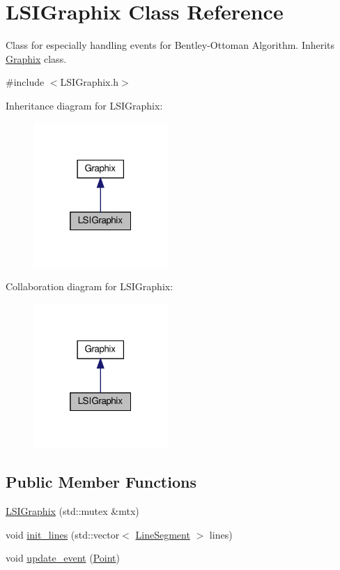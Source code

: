 \hypertarget{classLSIGraphix}{}\section{L\+S\+I\+Graphix Class Reference}
\label{classLSIGraphix}


Class for especially handling events for Bentley-\/\+Ottoman Algorithm. Inherits \hyperlink{classGraphix}{Graphix} class.  




{\ttfamily \#include $<$L\+S\+I\+Graphix.\+h$>$}



Inheritance diagram for L\+S\+I\+Graphix\+:
\nopagebreak
\begin{figure}[H]
\begin{center}
\leavevmode
\includegraphics[width=145pt]{classLSIGraphix__inherit__graph}
\end{center}
\end{figure}


Collaboration diagram for L\+S\+I\+Graphix\+:
\nopagebreak
\begin{figure}[H]
\begin{center}
\leavevmode
\includegraphics[width=145pt]{classLSIGraphix__coll__graph}
\end{center}
\end{figure}
\subsection*{Public Member Functions}
\begin{DoxyCompactItemize}
\item 
\hyperlink{classLSIGraphix_a36adc59a5f2f87571cb230de95e0c0bc}{L\+S\+I\+Graphix} (std\+::mutex \&mtx)
\item 
void \hyperlink{classLSIGraphix_aa95fa264bddca976f974f6eae9173444}{init\+\_\+lines} (std\+::vector$<$ \hyperlink{classLineSegment}{Line\+Segment} $>$ lines)
\item 
void \hyperlink{classLSIGraphix_a136dca7736d6a885ef9b40824808c447}{update\+\_\+event} (\hyperlink{classPoint}{Point})
\end{DoxyCompactItemize}
